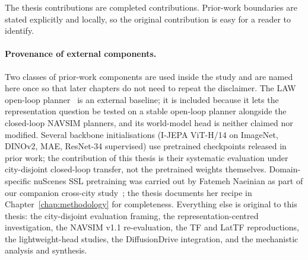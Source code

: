 The thesis contributions are completed contributions. Prior-work boundaries are stated explicitly and locally, so the original contribution is easy for a reader to identify.

\paragraph{Provenance of external components.}
Two classes of prior-work components are used inside the study and are named here once so that later chapters do not need to repeat the disclaimer. The LAW open-loop planner~\cite{li-law-2024} is an external baseline; it is included because it lets the representation question be tested on a stable open-loop planner alongside the closed-loop NAVSIM planners, and its world-model head is neither claimed nor modified. Several backbone initialisations (I-JEPA ViT-H/14 on ImageNet, DINOv2, MAE, ResNet-34 supervised) use pretrained checkpoints released in prior work; the contribution of this thesis is their systematic evaluation under city-disjoint closed-loop transfer, not the pretrained weights themselves. Domain-specific nuScenes SSL pretraining was carried out by Fatemeh Naeinian as part of our companion cross-city study~\cite{naeinian-cross-city-2026}; the thesis documents her recipe in Chapter~\ref{chap:methodology} for completeness. Everything else is original to this thesis: the city-disjoint evaluation framing, the representation-centred investigation, the NAVSIM v1.1 re-evaluation, the TF and LatTF reproductions, the lightweight-head studies, the DiffusionDrive integration, and the mechanistic analysis and synthesis.

